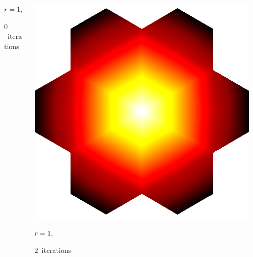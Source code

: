 \documentclass[aspectratio=169,t]{beamer}
\begin{document}
{\begin{columns}
\begin{column}{0.22\textwidth}
			{\footnotesize
				\par \vspace{-1mm} $r=1$,
				\par \vspace{-1mm} $0$~iterations
			}
		\end{column}
		\begin{column}{0.22\textwidth}
			\centering
			\includegraphics[width=.85\textwidth]{data/synthetic_meshes/hexagonal_tessellation_Dirac_delta_1_v31_f42_funcvals_2iter_crop.png}
			{\footnotesize
				\par \vspace{-1mm} $r=1$,
				\par \vspace{-1mm} $2$~iterations
			}
		\end{column}
		\begin{column}{0.17\textwidth}~\end{column}
	\end{columns}
	\vspace*{4mm}
	\begin{columns}
		\begin{column}{0.17\textwidth}~\end{column}
		\begin{column}{0.22\textwidth}
			\centering

\end{column}
\end{columns}}
\end{document}

